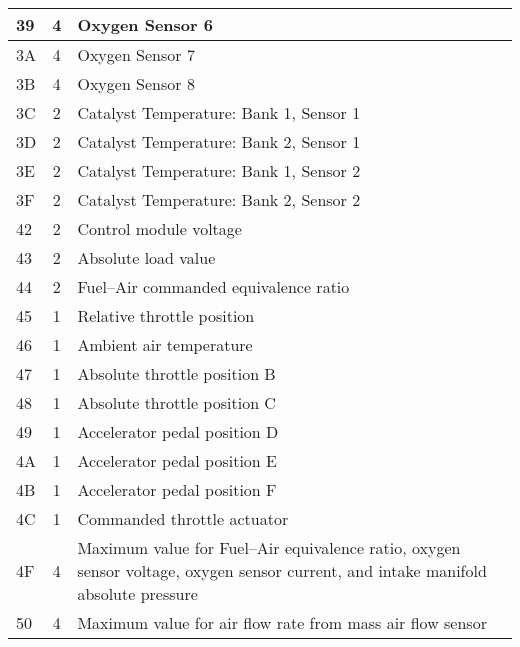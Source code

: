 \begin{longtable}{|l|c|p{10cm}|}
    39 & 4  & Oxygen Sensor 6                                               \\ \hline
    3A & 4  & Oxygen Sensor 7                                               \\ \hline
    3B & 4  & Oxygen Sensor 8                                               \\ \hline
    3C & 2  & Catalyst Temperature: Bank 1, Sensor 1                        \\ \hline
    3D & 2  & Catalyst Temperature: Bank 2, Sensor 1                        \\ \hline
    3E & 2  & Catalyst Temperature: Bank 1, Sensor 2                        \\ \hline
    3F & 2  & Catalyst Temperature: Bank 2, Sensor 2                        \\ \hline
    42 & 2  & Control module voltage                                        \\ \hline
    43 & 2  & Absolute load value                                           \\ \hline
    44 & 2  & Fuel–Air commanded equivalence ratio                          \\ \hline
    45 & 1  & Relative throttle position                                    \\ \hline
    46 & 1  & Ambient air temperature                                       \\ \hline
    47 & 1  & Absolute throttle position B                                  \\ \hline
    48 & 1  & Absolute throttle position C                                  \\ \hline
    49 & 1  & Accelerator pedal position D                                  \\ \hline
    4A & 1  & Accelerator pedal position E                                  \\ \hline
    4B & 1  & Accelerator pedal position F                                  \\ \hline
    4C & 1  & Commanded throttle actuator                                   \\ \hline
    4F & 4  & Maximum value for Fuel–Air equivalence ratio, oxygen sensor voltage,
    oxygen sensor current, and intake manifold absolute pressure            \\ \hline
    50 & 4  & Maximum value for air flow rate from mass air flow sensor     \\ \hline

\end{longtable}
